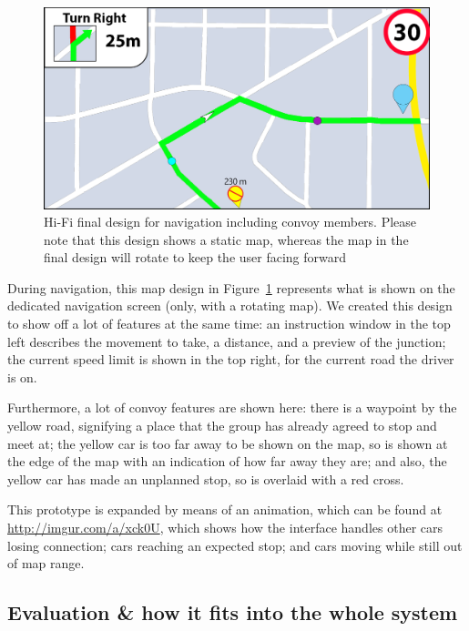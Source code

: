 \documentclass{article}
\begin{document}
\begin{figure}[H]
  \centering
  \includegraphics[scale=0.3]{convoy-map}
  \caption{Hi-Fi final design for navigation including convoy members. Please note that this design shows a static map, whereas the map in the final design will rotate to keep the user facing forward}\label{convoy-map}
\end{figure}
During navigation, this map design in Figure~\ref{convoy-map} represents what is shown on the dedicated navigation screen (only, with a rotating map). We created this design to show off a lot of features at the same time: an instruction window in the top left describes the movement to take, a distance, and a preview of the junction; the current speed limit is shown in the top right, for the current road the driver is on.

Furthermore, a lot of convoy features are shown here: there is a waypoint by the yellow road, signifying a place that the group has already agreed to stop and meet at; the yellow car is too far away to be shown on the map, so is shown at the edge of the map with an indication of how far away they are; and also, the yellow car has made an unplanned stop, so is overlaid with a red cross.

This prototype is expanded by means of an animation, which can be found at \url{http://imgur.com/a/xck0U}, which shows how the interface handles other cars losing connection; cars reaching an expected stop; and cars moving while still out of map range.


\subsection{Evaluation \& how it fits into the whole system}\label{ssec:nav-evaluation}
\end{document}
